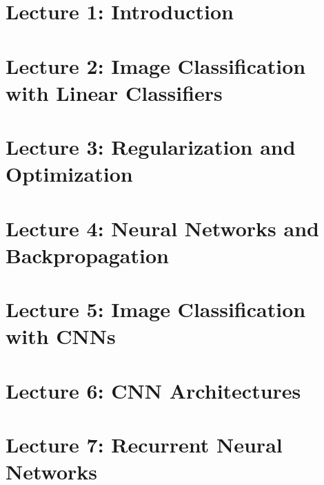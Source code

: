 \documentclass[a4paper]{article}
\begin{document}
\section{Lecture 1: Introduction}


\section{Lecture 2: Image Classification with Linear Classifiers}


\section{Lecture 3: Regularization and Optimization}


\section{Lecture 4: Neural Networks and Backpropagation}


\section{Lecture 5: Image Classification with CNNs}


\section{Lecture 6: CNN Architectures}


\section{Lecture 7: Recurrent Neural Networks}

\end{document}
